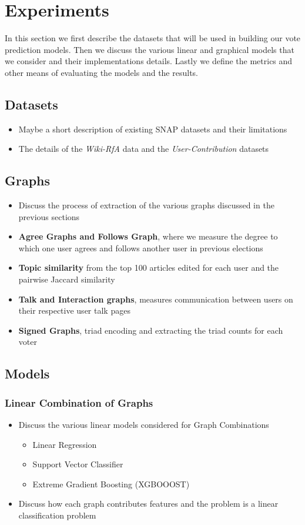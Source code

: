 \chapter{Experiments}
In this section we first describe the datasets that will be used in building our vote prediction models. Then we discuss the various linear and graphical models that we consider and their implementations details. Lastly we define the metrics and other means of evaluating the models and the results.

\section{Datasets}
\begin{itemize}
    \item Maybe a short description of existing SNAP datasets and their limitations
    \item The details of the \textit{Wiki-RfA} data and the \textit{User-Contribution} datasets
\end{itemize}
\section{Graphs}
\begin{itemize}
    \item Discuss the process of extraction of the various graphs discussed in the previous sections
    \item \textbf{Agree Graphs and Follows Graph}, where we measure the degree to which one user agrees and follows another user in previous elections
    \item \textbf{Topic similarity} from the top 100 articles edited for each user and the pairwise Jaccard similarity 
    \item \textbf{Talk and Interaction graphs}, measures communication between users on their respective user talk pages
    \item \textbf{Signed Graphs}, triad encoding and extracting the triad counts for each voter
\end{itemize}
\section{Models}
\subsection{Linear Combination of Graphs}
\begin{itemize}
    \item Discuss the various linear models considered for Graph Combinations
    \begin{itemize}
        \item Linear Regression
        \item Support Vector Classifier
        \item Extreme Gradient Boosting (XGBOOOST) 
    \end{itemize}
    \item Discuss how each graph contributes features and the problem is a linear classification problem
\end{itemize}
